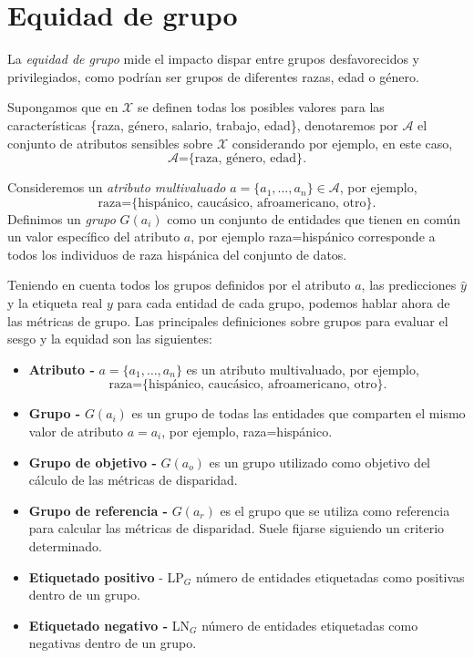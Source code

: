 \documentclass[oneside,openright,titlepage,numbers=noenddot,openany,headinclude,footinclude=true,
cleardoublepage=empty,abstractoff,BCOR=5mm,paper=a4,fontsize=12pt,main=spanish]{scrreprt}
\begin{document}
\section{Equidad de grupo} 
\label{sec:groupmetrics}

La \textit{equidad de grupo} mide el impacto dispar entre grupos desfavorecidos y privilegiados, como podrían ser grupos de diferentes razas, edad o género.

Supongamos que en $\mathcal{X}$ se definen todas los posibles valores para las características \{raza, género, salario, trabajo, edad\}, denotaremos por $\mathcal{A}$ el conjunto de atributos sensibles sobre $\mathcal{X}$ considerando por ejemplo, en este caso, $$\mathcal{A}\text{=\{raza, género, edad\}}.$$

Consideremos un \textit{atributo multivaluado} $a = \{a_1,\dots,a_n\} \in \mathcal{A}$, por ejemplo, $$\text{raza=\{hispánico, caucásico, afroamericano, otro\}}.$$ Definimos un \textit{grupo} $G(a_i)$
como un conjunto de entidades que tienen en común un valor específico
del atributo $a$, por ejemplo raza=hispánico corresponde a todos los individuos de raza hispánica del
conjunto de datos.

Teniendo en cuenta todos los grupos definidos por el atributo $a$, las predicciones $\hat{y}$ y la etiqueta real $y$ para cada entidad de cada grupo, podemos hablar ahora de las métricas de grupo. Las principales definiciones sobre grupos para
evaluar el sesgo y la equidad son las siguientes:

\begin{itemize}
    \item \textbf{Atributo -} $a = \{a_1,\dots,a_n\}$ es un atributo multivaluado, por ejemplo, $$\text{raza=\{hispánico, caucásico, afroamericano, otro\}}.$$
    \item \textbf{Grupo -} $G(a_i)$ es un grupo de todas las entidades que comparten el mismo valor de atributo $a=a_i$, por ejemplo, raza=hispánico.
    \item \textbf{Grupo de objetivo -} $G(a_o)$ es un grupo utilizado como objetivo del cálculo de las métricas de disparidad.
    \item \textbf{Grupo de referencia -} $G(a_r)$ es el grupo que se utiliza como referencia para calcular las métricas de disparidad. Suele fijarse siguiendo un criterio determinado.
    \item \textbf{Etiquetado positivo} - LP$_G$ número de entidades etiquetadas como positivas dentro de un grupo.
    \item \textbf{Etiquetado negativo -} LN$_G$ número de entidades etiquetadas como negativas dentro de un grupo.
\end{itemize}
\end{document}
